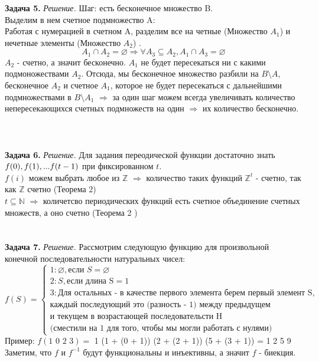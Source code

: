 \documentclass[12pt,a4paper]{scrartcl}
\begin{document}
\noindent \textbf{Задача 5.}
\textit{Решение.} Шаг: есть бесконечное множество B.\\ 
Выделим в нем  счетное  подмножество A: \\
Работая с нумерацией в счетном A, разделим все  на четные  (Множество $A_1$) и нечетные элементы (Множество $A_2$) . \\
$$A_1 \cap A_2 = \varnothing \Rightarrow \forall A_3 \subseteq A_2,  A_1 \cap A_3 = \varnothing $$
$A_2$ -  счетно, а значит бесконечно. $A_1$ не будет пересекаться ни с какими подмоножествами $A_2$. Отсюда, мы  бесконечное множество разбили на   $B \setminus A$,  бесконечное $A_2$  и  счетное $A_1$, которое не будет пересекаться с дальнейшими  подмножествами в $B \setminus A_1$ $\Rightarrow$ за один шаг можем всегда увеличивать количество непересекающихся счетных подмножеств на один $\Rightarrow$ их количество бесконечно. \\
\\ \\ \\


\noindent \textbf{Задача 6.}
\textit{Решение.} Для задания переодической функции  достаточно знать $f(0), f(1), ... \\ f(t-1)$ при фиксированном $t$. \\
$f(i)$ можем выбрать  любое из $\mathbb Z$ $\Rightarrow$ количество таких функций  $\mathbb Z^{t}$ - счетно, так как $\mathbb Z$ счетно (Теорема 2) \\
$t \subseteq \mathbb N$ $\Rightarrow$ количетсво периодических функций есть  счетное объединение счетных множеств, а оно счетно (Теорема 2 )
\\ \\ \\


\noindent \textbf{Задача 7.}
\textit{Решение.} Рассмотрим следующую функцию для  произвольной конечной последовательности натуральных чисел:
$$
f(S) = 
\begin{cases}
1:  \varnothing , \text{если } S =  \varnothing 
\\
2:  S,  \text{если длина S} = 1
\\
3:  \text{Для остальных - в качестве первого элемента берем первый элемент S, } 
\\ 
\text{каждый последующий это (разность -  1)  между предыдущем} 
\\
\text{и текущем в возрастающей последовательсти H}
\\
\text{(сместили на 1 для того, чтобы мы могли  работать с нулями) } 
\end{cases}
$$
Пример: $f(\text{1 0 2 3}) =$ 1 (1 + (0 + 1))  (2 + (2 + 1))  (5 + (3 + 1)) = 1 2 5 9 \\
 Заметим, что $f \text{ и } f^{-1}$ будут функциональны и инъективны, а значит $f$ - биекция. 
\end{document}
